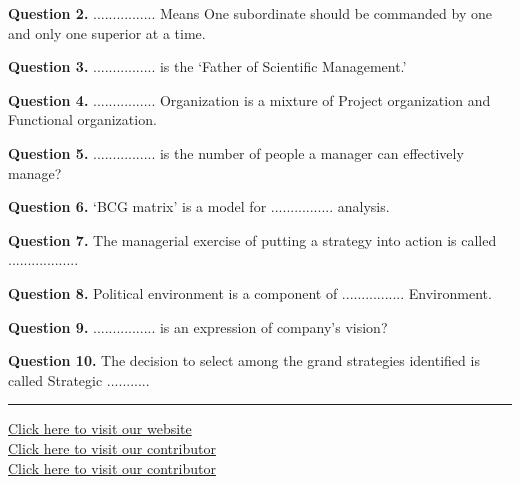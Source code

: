 \documentclass[11pt,a4paper]{article}
\begin{document}
\medskip


\noindent   \textbf{Question 2.} ................ Means One subordinate should be commanded by one and only one superior at a
time.

\medskip


\noindent   \textbf{Question 3.} ................ is the ‘Father of Scientific Management.’

\medskip


\noindent   \textbf{Question 4.} ................ Organization is a mixture of Project organization and Functional organization.

\medskip


\noindent   \textbf{Question 5.} ................ is the number of people a manager can effectively manage?

\medskip


\noindent   \textbf{Question 6.} ‘BCG matrix’ is a model for ................ analysis.

\medskip


\noindent   \textbf{Question 7.} The managerial exercise of putting a strategy into action is called ..................

\medskip


\noindent   \textbf{Question 8.} Political environment is a component of ................ Environment.

\medskip


\noindent   \textbf{Question 9.} ................ is an expression of company's vision?

\medskip


\noindent   \textbf{Question 10.} The decision to select among the grand strategies identified is called Strategic ...........

\vfill
\rule{\linewidth}{0.4pt}

\begin{center}\small
\href{https://bhu-exam.vercel.app/}{Click here to visit our website}\\[4pt]\href{https://me-aryan.vercel.app/}{Click here to visit our contributor}\\[4pt]\href{https://quashan-me.vercel.app/}{Click here to visit our contributor}
\end{center}
\end{document}
